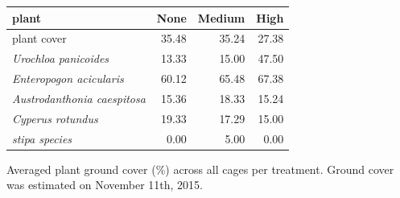 \documentclass[
]{article}
\begin{document}
\begin{tbl}

\begin{minipage}{\linewidth}

\begingroup
\fontsize{12.0pt}{14.4pt}\selectfont
\begin{longtable*}{lrrr}
\toprule
plant & None & Medium & High \\ 
\midrule\addlinespace[2.5pt]
plant cover & 35.48 & 35.24 & 27.38 \\ 
{\itshape Urochloa panicoides} & 13.33 & 15.00 & 47.50 \\ 
{\itshape Enteropogon acicularis} & 60.12 & 65.48 & 67.38 \\ 
{\itshape Austrodanthonia caespitosa} & 15.36 & 18.33 & 15.24 \\ 
{\itshape Cyperus rotundus} & 19.33 & 17.29 & 15.00 \\ 
{\itshape stipa species} & 0.00 & 5.00 & 0.00 \\ 
\bottomrule
\end{longtable*}
\endgroup

\end{minipage}%

\caption{\label{tbl-field-cage-plant-ground-cover}Averaged plant ground
cover (\%) across all cages per treatment. Ground cover was estimated on
November 11th, 2015.}

\end{tbl}%
\end{document}

